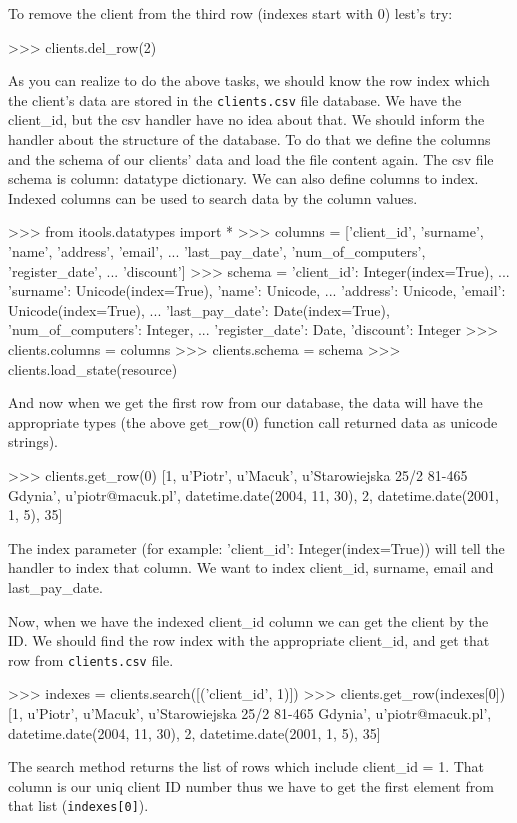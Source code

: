 \documentclass[a4paper]{book}
\begin{document}
To remove the client from the third row (indexes start with 0) lest's try:
\begin{code}
    >>> clients.del_row(2)
\end{code}
As you can realize to do the above tasks, we should know the row index 
which the client's data are stored in the {\tt clients.csv} file database. 
We have the client\_id, but the csv handler have no idea about that. 
We should inform the handler about the structure of the database. To do that 
we define the columns and the schema of our clients' data and load the file 
content again. The csv file schema is column: datatype dictionary. We can 
also define columns to index. Indexed columns can be used to search data 
by the column values.
\begin{code}
    >>> from itools.datatypes import *
    >>> columns = ['client_id', 'surname', 'name', 'address', 'email',
    ... 'last_pay_date', 'num_of_computers', 'register_date',
    ... 'discount']
    >>> schema = {'client_id': Integer(index=True), 
    ... 'surname': Unicode(index=True), 'name': Unicode, 
    ... 'address': Unicode, 'email': Unicode(index=True),
    ... 'last_pay_date': Date(index=True), 'num_of_computers': Integer,
    ... 'register_date': Date, 'discount': Integer}
    >>> clients.columns = columns
    >>> clients.schema = schema
    >>> clients.load_state(resource)
\end{code}

And now when we get the first row from our database, the data will have the 
appropriate types (the above get\_row(0) function call returned data as unicode 
strings).
\begin{code}
    >>> clients.get_row(0)
    [1, u'Piotr', u'Macuk', u'Starowiejska 25/2 81-465 Gdynia',
    u'piotr@macuk.pl', datetime.date(2004, 11, 30), 2, 
    datetime.date(2001, 1, 5), 35] 
\end{code}

The index parameter (for example: 'client\_id': Integer(index=True)) will 
tell the handler to index that column. We want to index client\_id, surname,
email and last\_pay\_date.

Now, when we have the indexed client\_id column we can get the client
by the ID. We should find the row index with the appropriate client\_id,
and get that row from {\tt clients.csv} file.
\begin{code}
    >>> indexes = clients.search([('client_id', 1)])
    >>> clients.get_row(indexes[0])
    [1, u'Piotr', u'Macuk', u'Starowiejska 25/2 81-465 Gdynia', 
    u'piotr@macuk.pl', datetime.date(2004, 11, 30), 2, 
    datetime.date(2001, 1, 5), 35]
\end{code}
The search method returns the list of rows which include client\_id = 1.
That column is our uniq client ID number thus we have to get the first
element from that list ({\tt indexes[0]}).
\end{document}
